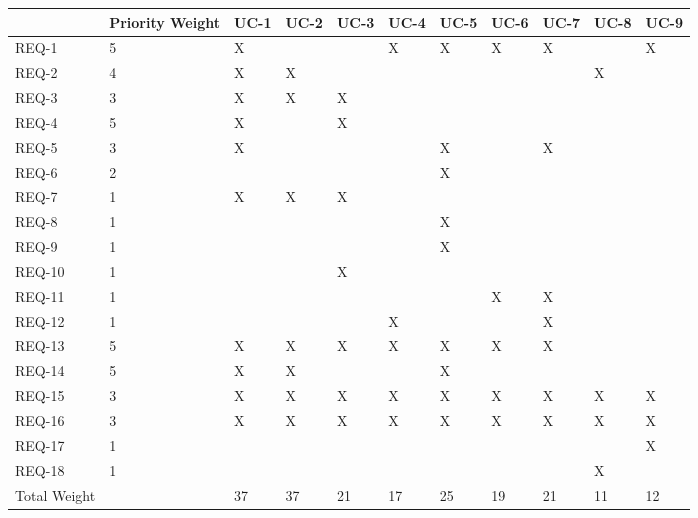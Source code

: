 \documentclass[letterpaper,english, 12pt]{scrreprt}
\begin{document}
\renewcommand{\arraystretch}{0.4}
\begin{center}
        \begin{tabular}{|C{1cm}|C{1cm}|C{1cm}|C{1cm}|C{1cm}|C{1cm}|C{1cm}|C{1cm}|C{1cm}|C{1cm}|C{1cm}|}
                \hline
                         & Priority Weight & UC-1 & UC-2 & UC-3 & UC-4 & UC-5 & UC-6 & UC-7 & UC-8 & UC-9\\
                \hline
                        REQ-1  & 5 & X &   &   & X & X & X & X &  & X  \\
                \hline
                        REQ-2  & 4 & X & X &   &   &   &   &   & X &   \\
                \hline
                        REQ-3  & 3 & X & X & X &   &   &   &   &  &   \\
                \hline
                        REQ-4  & 5 & X &   & X &   &   &   &   &  &   \\
                \hline
                        REQ-5  & 3 & X &   &   &   & X &   & X &  &   \\
                \hline
                        REQ-6  & 2 &   &   &   &   & X &   &   &  &   \\
                \hline
                        REQ-7  & 1 & X & X & X &   &   &   &   &  &   \\
                \hline
                        REQ-8  & 1 &   &   &   &   & X &   &   &  &   \\
                \hline
                        REQ-9  & 1 &   &   &   &   & X &   &   &  &   \\
                \hline
                        REQ-10 & 1 &   &   & X &   &   &   &   &  &   \\
                \hline
                        REQ-11 & 1 &   &   &   &   &   & X & X &  &   \\
		\hline
			REQ-12 & 1 &   &   &   & X &   &   & X &  &   \\
                \hline
                        REQ-13 & 5 & X & X & X & X & X & X & X &  &   \\
                \hline
                        REQ-14 & 5 & X & X &   &   & X &   &   &  &   \\
                \hline
                        REQ-15 & 3 & X & X & X & X & X & X & X & X & X  \\
                \hline
                        REQ-16 & 3 & X & X & X & X & X & X & X & X & X  \\
                \hline
        		REQ-17 & 1 &   &   &   &   &   &   &   &   &  X \\
                \hline
         		REQ-18 & 1 &   &   &   &   &   &   &   & X &    \\
                \hline
                  Total Weight &   & 37& 37& 21& 17& 25& 19& 21 & 11 & 12  \\
                \hline
        \end{tabular}
\end{center}
\end{document}
